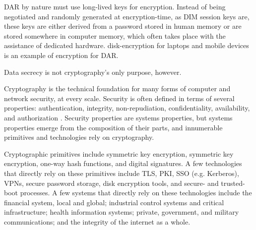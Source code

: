 \Ac{DAR} by nature must use long-lived keys for encryption. Instead of being negotiated and randomly generated at
encryption-time, as \ac{DIM} session keys are, these keys are either derived from a password stored in human memory or
are stored somewhere in computer memory, which often takes place with the assistance of dedicated hardware.
\Ac{disk-encryption} for laptops and mobile devices is an example of encryption for \ac{DAR}.

Data secrecy is not cryptography's only purpose, however.

Cryptography is the technical foundation for many forms of computer and network security, at every scale. Security is
often defined in terms of several properties: authentication, integrity, non-repudiation, confidentiality, availability,
and authorization \cite{shostack_threat_2014}. Security properties are systems properties, but systems properties emerge
from the composition of their parts, and innumerable primitives and technologies rely on cryptography.


Cryptographic primitives include symmetric key encryption, symmetric key encryption, one-way hash functions, and digital
signatures. A few technologies that directly rely on these primitives include \ac{TLS}, \ac{PKI}, \ac{SSO} (e.g.
Kerberos), \acp{VPN}, secure password storage, disk encryption tools, and secure- and trusted-boot processes. A few
systems that directly rely on these technologies include the financial system, local and global; industrial control
systems and critical infrastructure; health information systems; private, government, and military communications; and
the integrity of the internet as a whole.



